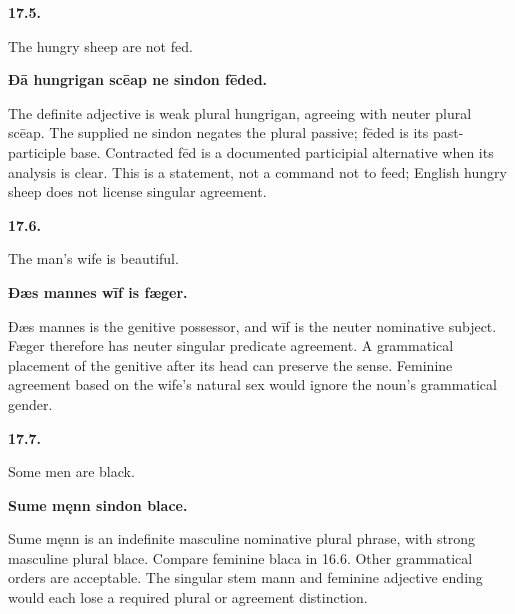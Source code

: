 \par\begin{minipage}{\linewidth}\raggedright
\textbf{17.5.}

The hungry sheep are not fed.

\textbf{Ðā hungrigan scēap ne sindon fēded.}

The definite adjective is weak plural hungrigan, agreeing with neuter plural scēap. The supplied ne sindon negates the plural passive; fēded is its past-participle base. Contracted fēd is a documented participial alternative when its analysis is clear. This is a statement, not a command not to feed; English hungry sheep does not license singular agreement.

\end{minipage}\par\addvspace{4pt}

\par\begin{minipage}{\linewidth}\raggedright
\textbf{17.6.}

The man’s wife is beautiful.

\textbf{Ðæs mannes wīf is fæger.}

Ðæs mannes is the genitive possessor, and wīf is the neuter nominative subject. Fæger therefore has neuter singular predicate agreement. A grammatical placement of the genitive after its head can preserve the sense. Feminine agreement based on the wife's natural sex would ignore the noun's grammatical gender.

\end{minipage}\par\addvspace{4pt}

\par\begin{minipage}{\linewidth}\raggedright
\textbf{17.7.}

Some men are black.

\textbf{Sume męnn sindon blace.}

Sume męnn is an indefinite masculine nominative plural phrase, with strong masculine plural blace. Compare feminine blaca in 16.6. Other grammatical orders are acceptable. The singular stem mann and feminine adjective ending would each lose a required plural or agreement distinction.

\end{minipage}\par\addvspace{4pt}

